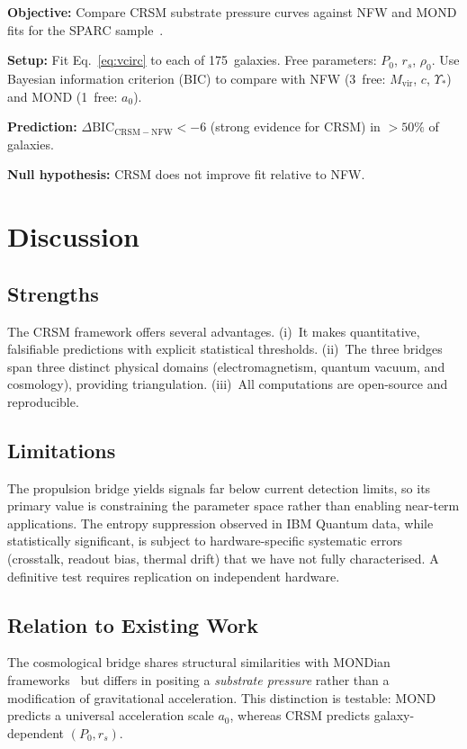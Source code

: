 \documentclass[aps,preprint,superscriptaddress,longbibliography]{revtex4-2}
\begin{document}
\textbf{Objective:} Compare CRSM substrate pressure curves against
NFW and MOND fits for the SPARC sample~\cite{sparc}.

\textbf{Setup:} Fit Eq.~\eqref{eq:vcirc} to each of 175~galaxies.
Free parameters: $P_0$, $r_s$, $\rho_0$.  Use Bayesian information
criterion (BIC) to compare with NFW (3~free: $M_{\mathrm{vir}}$,
$c$, $\Upsilon_*$) and MOND (1~free: $a_0$).

\textbf{Prediction:} $\Delta\mathrm{BIC}_{\mathrm{CRSM-NFW}} < -6$
(strong evidence for CRSM) in $> 50\%$ of galaxies.

\textbf{Null hypothesis:} CRSM does not improve fit relative to
NFW.

\section{Discussion}
\label{sec:discussion}

\subsection{Strengths}

The CRSM framework offers several advantages.  (i)~It makes
quantitative, falsifiable predictions with explicit statistical
thresholds.  (ii)~The three bridges span three distinct physical
domains (electromagnetism, quantum vacuum, and cosmology), providing
triangulation.  (iii)~All computations are open-source and
reproducible.

\subsection{Limitations}

The propulsion bridge yields signals far below current detection
limits, so its primary value is constraining the parameter space
rather than enabling near-term applications.  The entropy
suppression observed in IBM Quantum data, while statistically
significant, is subject to hardware-specific systematic errors
(crosstalk, readout bias, thermal drift) that we have not fully
characterised.  A definitive test requires replication on
independent hardware.

\subsection{Relation to Existing Work}

The cosmological bridge shares structural similarities with
MONDian frameworks~\cite{milgrom1983} but differs in positing a
\emph{substrate pressure} rather than a modification of
gravitational acceleration.  This distinction is testable: MOND
predicts a universal acceleration scale $a_0$, whereas CRSM
predicts galaxy-dependent $(P_0, r_s)$.
\end{document}
